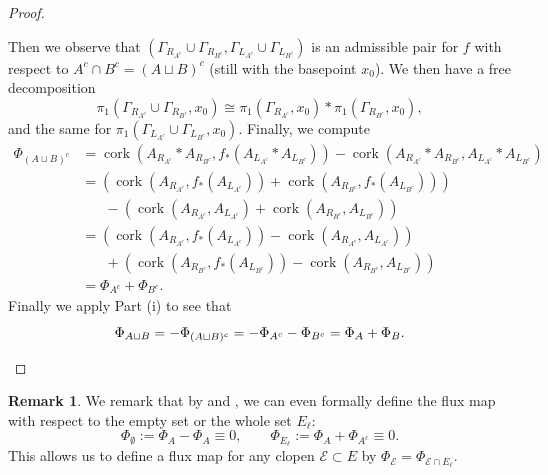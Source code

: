 \documentclass[11pt]{amsart}
\theoremstyle{plain}
\theoremstyle{definition}
\newtheorem{RMK}[THM]{Remark}
\DeclareMathOperator{\cork}{cork}
\newcommand{\cE}{\mathcal{E}}
\def\G{{\Gamma}}
\newcommand{\<}{\langle}
\renewcommand{\>}{\rangle}
\begin{document}
\begin{proof}
\begin{enumerate}[label=(\roman*)]
        Then we observe that $(\G_{R_{A^{c}}} \cup \G_{R_{B^{c}}}, \G_{L_{A^{c}}} \cup \G_{L_{B^{c}}})$ is an admissible pair for $f$ with respect to $A^{c} \cap B^{c} = (A \sqcup B)^{c}$ (still with the basepoint $x_{0}$). We then have a free decomposition
            \[
                \pi_1(\G_{R_{A^{c}}} \cup \G_{R_{B^{c}}}, x_0) \cong \pi_1(\G_{R_{A^{c}}},x_0) \ast \pi_1(\G_{R_{B^{c}}},x_0),
            \]
            and the same for $\pi_1(\G_{L_{A^{c}}} \cup \G_{L_{B^{c}}},x_0)$.
            Finally, we compute 
            \begin{align*}
                \Phi_{(A \sqcup B)^{c}} &=
                \cork\left(A_{R_{A^{c}}} \ast A_{R_{B^{c}}}, f_*(A_{L_{A^{c}}} \ast A_{L_{B^{c}}}) \right) -
                \cork\left(A_{R_{A^{c}}} \ast A_{R_{B^{c}}}, A_{L_{A^{c}}} \ast A_{L_{B^{c}}} \right)\\
                &= \left(\cork(A_{R_{A^{c}}}, f_*(A_{L_{A^{c}}})) + \cork(A_{R_{B^{c}}}, f_*(A_{L_{B^{c}}})) \right)  \\
                &\hspace{20pt}-
                \left(\cork(A_{R_{A^{c}}}, A_{L_{A^{c}}}) + \cork(A_{R_{B^{c}}}, A_{L_{B^{c}}}) \right)\\
                &= \left(\cork(A_{R_{A^{c}}}, f_*(A_{L_{A^{c}}})) - \cork(A_{R_{A^{c}}}, A_{L_{A^{c}}}) \right) \\
                &\hspace{20pt}+
                \left(\cork(A_{R_{B^{c}}}, f_*(A_{L_{B^{c}}})) - \cork(A_{R_{B^{c}}}, A_{L_{B^{c}}}) \right) \\
                &= \Phi_{A^{c}} + \Phi_{B^{c}}.
        \end{align*}
        Finally we apply Part (i) to see that 
        \[
        \Phi_{A \sqcup B} = -\Phi_{(A \sqcup B)^{c}} = -\Phi_{A^{c}} - \Phi_{B^{c}} = \Phi_{A} + \Phi_{B}. \qedhere
        \]
\end{enumerate}
\end{proof}

\begin{RMK}\label{rmk:fluxwholeempty}
    We remark that by  and , we can even formally define the flux map with respect to the empty set or the whole set $E_\ell$: \[
\Phi_{\emptyset}:= \Phi_A - \Phi_A \equiv 0, \qquad \Phi_{E_\ell} := \Phi_{A} + \Phi_{A^c } \equiv 0.
\] This allows us to define a flux map for any clopen $\cE\subset E$ by $\Phi_{\mathcal{E}}=\Phi_{\mathcal{E}\cap E_{\ell}}$.
\end{RMK}
\end{document}
